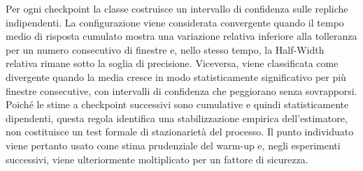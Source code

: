 ﻿\documentclass[a4paper,12pt]{article}
\begin{document}
Per ogni checkpoint la classe costruisce un intervallo di confidenza sulle repliche indipendenti. La configurazione viene considerata convergente quando il tempo medio di risposta cumulato mostra una variazione relativa inferiore alla tolleranza per un numero consecutivo di finestre e, nello stesso tempo, la Half-Width relativa rimane sotto la soglia di precisione. Viceversa, viene classificata come divergente quando la media cresce in modo statisticamente significativo per più finestre consecutive, con intervalli di confidenza che peggiorano senza sovrapporsi. Poiché le stime a checkpoint successivi sono cumulative e quindi statisticamente dipendenti, questa regola identifica una stabilizzazione empirica dell'estimatore, non costituisce un test formale di stazionarietà del processo. Il punto individuato viene pertanto usato come stima prudenziale del warm-up e, negli esperimenti successivi, viene ulteriormente moltiplicato per un fattore di sicurezza.
\end{document}
